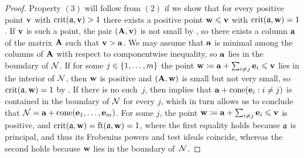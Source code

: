 \documentclass{article}
\begin{document}
\begin{proof}
   Property $(3)$ will follow from $(2)$ if we show that for every positive point $\mathbf{v}$ with $\operatorname{crit}(\mathfrak{a},\mathbf{v})>1$ there exists a positive point $\mathbf{w} \leqslant \mathbf{v}$ with $\operatorname{crit}(\mathfrak{a},\mathbf{w})=1$.
   If $\mathbf{v}$ is such a point, the pair $(\mathbf{A},\mathbf{v})$ is not small by , so there exists a column $\mathbf{a}$ of the matrix $\mathbf{A}$ such that $\mathbf{v} > \mathbf{a}$.
   We may assume that $\mathbf{a}$ is minimal among the columns of $\mathbf{A}$ with respect to componentwise inequality, so $\mathbf{a}$ lies in the boundary of $\mathcal{N}$.
   If for some $j \in \{1,\ldots,m\}$ the point $\mathbf{w} \coloneqq \mathbf{a}+ \sum_{i\ne j} \mathbf{e}_i \leqslant \mathbf{v}$ lies in the interior of $\mathcal{N}$, then $\mathbf{w}$ is positive and $(\mathbf{A},\mathbf{w})$ is small but not very small, so $\operatorname{crit}(\mathfrak{a},\mathbf{w}) = 1$ by .
   If there is no such~$j$, then  implies that $\mathbf{a}+\operatorname{cone}(\mathbf{e}_i: i\ne j)$ is contained in the boundary of $\mathcal{N}$ for every $j$, which in turn allows us to conclude that $\mathcal{N} = \mathbf{a} + \operatorname{cone}(\mathbf{e}_1,\ldots,\mathbf{e}_m)$.
   For some $j$, the point $\mathbf{w} \coloneqq \mathbf{a}+ \sum_{i\ne j} \mathbf{e}_i \leqslant \mathbf{v}$ is positive, and $\operatorname{crit}(\mathfrak{a},\mathbf{w}) = \operatorname{ft}(\mathfrak{a}, \mathbf{w}) =1$, where the first equality holds because $\mathfrak{a}$ is principal, and thus its Frobenius powers and test ideals coincide, whereas the second holds because $\mathbf{w}$ lies in the boundary of~$\mathcal{N}$.
\end{proof}
\end{document}
